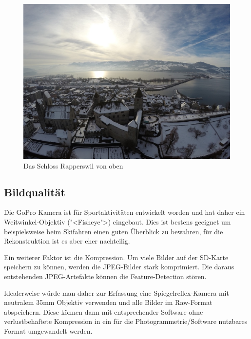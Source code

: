 \begin{figure}[H]
	\centering
	\includegraphics[width=\textwidth]{images/drone-pic-2.jpg}
	\caption{Das Schloss Rapperswil von oben}
	\label{img:drone-pic-2}
\end{figure}

\subsection{Bildqualität}\label{workflow:erfassung:bildqualitaet}

Die GoPro Kamera ist für Sportaktivitäten entwickelt worden und hat daher ein
Weitwinkel-Objektiv ("<Fisheye">) eingebaut. Dies ist bestens geeignet um
beispielsweise beim Skifahren einen guten Überblick zu bewahren, für die
Rekonstruktion ist es aber eher nachteilig.

Ein weiterer Faktor ist die Kompression. Um viele Bilder auf der SD-Karte
speichern zu können, werden die JPEG-Bilder stark komprimiert. Die daraus
entstehenden JPEG-Artefakte können die Feature-Detection stören.


Idealerweise würde man daher zur Erfassung eine Spiegelreflex-Kamera mit
neutralem 35mm Objektiv verwenden und alle Bilder im Raw-Format abspeichern.
Diese können dann mit entsprechender Software ohne verlustbehaftete Kompression
in ein für die Photogrammetrie\-/Software nutzbares Format umgewandelt werden.

